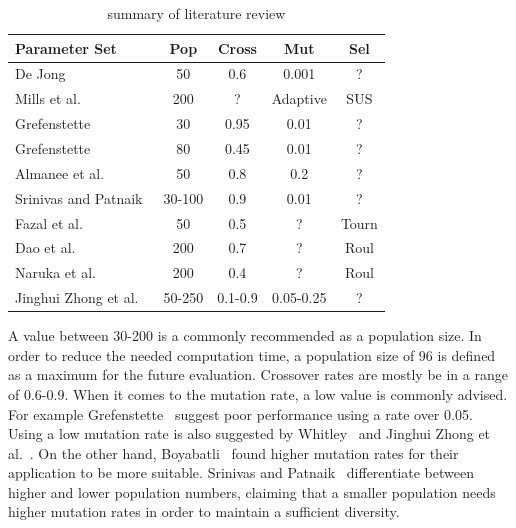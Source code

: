 \begin{table}[ht]
	\centering
	\begin{tabular}{lcccc}
		\hline
		\textbf{Parameter Set} & \textbf{Pop} & \textbf{Cross} & \textbf{Mut} & \textbf{Sel} \\
		\hline
		De Jong~\cite{de_jong_analysis_1975} & 50 & 0.6 & 0.001 & ? \\
		Mills et al.~\cite{mills_determining_2015} & 200 & ? & Adaptive & SUS\\
		Grefenstette~\cite{grefenstette_optimization_1986} & 30 & 0.95 & 0.01 & ?\\
		Grefenstette~\cite{grefenstette_optimization_1986} & 80 & 0.45 & 0.01 & ?\\
		Almanee et al.~\cite{almanee_scenorita_2021} & 50 & 0.8 & 0.2 & ?\\
		Srinivas and Patnaik~\cite{srinivas_genetic_1994}  & 30-100 & 0.9 & 0.01 & ?\\
		Fazal et al.~\cite{fazal_estimating_2005} & 50 & 0.5 & ? & Tourn\\
		Dao et al.~\cite{dao_maximising_2016} & 200 & 0.7 & ? & Roul\\
		Naruka et al.~\cite{naruka_parameter_2019} & 200 & 0.4 & ? & Roul \\
		Jinghui Zhong et al.~\cite{jinghui_zhong_comparison_2005} & 50-250 & 0.1-0.9 & 0.05-0.25 & ?\\
		\hline
	\end{tabular}
	\caption{summary of literature review}
	\label{tab:hyperparameter_tuning:ga_hyperparameters}
\end{table}

A value between 30-200 is a commonly recommended as a population size. In order to reduce the needed computation time, a population size of 96 is defined as a maximum for the future evaluation. Crossover rates are mostly be in a range of 0.6-0.9. When it comes to the mutation rate, a low value is commonly advised. For example Grefenstette~\cite{grefenstette_optimization_1986} suggest poor performance using a rate over 0.05. Using a low mutation rate is also suggested by Whitley~\cite{whitley_genetic_1994} and Jinghui Zhong et al.~\cite{jinghui_zhong_comparison_2005}. On the other hand, Boyabatli~\cite{boyabatli_parameter_2004} found higher mutation rates for their application to be more suitable. Srinivas and Patnaik~\cite{srinivas_genetic_1994} differentiate between higher and lower population numbers, claiming that a smaller population needs higher mutation rates in order to maintain a sufficient diversity.

